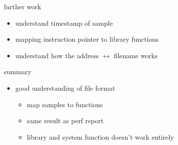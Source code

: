 \begin{frame}{further work}
\begin{itemize}
  \item understand timestamp of sample
  \item mapping instruction pointer to library functions
  \item understand how the address $\leftrightarrow$ filename works
\end{itemize}
\end{frame}

\begin{frame}{summary}
\begin{itemize}
  \item good understanding of file format
  \begin{itemize}
    \item map samples to functions
    \item same result as perf report
    \item library and system function doesn't work entirely
  \end{itemize}
\end{itemize}
\end{frame}



